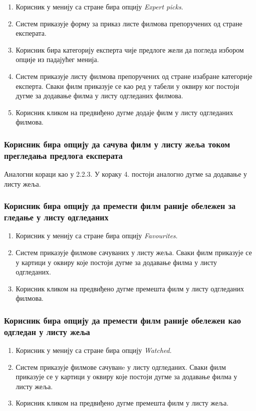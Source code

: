 \begin{enumerate}
    \item Корисник у менију са стране бира опцију \textit{Expert picks}.
    \item Систем приказује форму за приказ листе филмова препоручених од стране експерата.
    \item Корисник бира категорију експерта чије предлоге жели да погледа избором опције из падајућег менија.
    \item Систем приказује листу филмова препоручених од стране изабране категорије експерта. Сваки филм приказује 
    се као ред у табели у оквиру ког постоји дугме за додавање филма у листу одгледаних филмова.
    \item Корисник кликом на предвиђено дугме додаје филм у листу одгледаних филмова.
\end{enumerate}

\subsubsection{Корисник бира опцију да сачува филм у листу жеља током прегледања предлога експерата}

Аналогни кораци као у 2.2.3. У кораку 4. постоји аналогно дугме ѕа додавање у листу жеља.

\subsubsection{Корисник бира опцију да премести филм раније обележен за гледање у листу одгледаних}

\begin{enumerate}
    \item Корисник у менију са стране бира опцију \textit{Favourites}.
    \item Систем приказује филмове сачуваних у листу жеља. Сваки филм приказује се у картици 
    у оквиру које постоји дугме за додавање филма у листу одгледаних.
    \item Корисник кликом на предвиђено дугме премешта филм у листу одгледаних филмова.
\end{enumerate}

\subsubsection{Корисник бира опцију да премести филм раније обележен као одгледан у листу жеља}

\begin{enumerate}
    \item Корисник у менију са стране бира опцију \textit{Watched}.
    \item Систем приказује филмове сачуванe у листу одгледаних. Сваки филм приказује се у картици 
    у оквиру које постоји дугме за додавање филма у листу жеља.
    \item Корисник кликом на предвиђено дугме премешта филм у листу жеља.
\end{enumerate}

